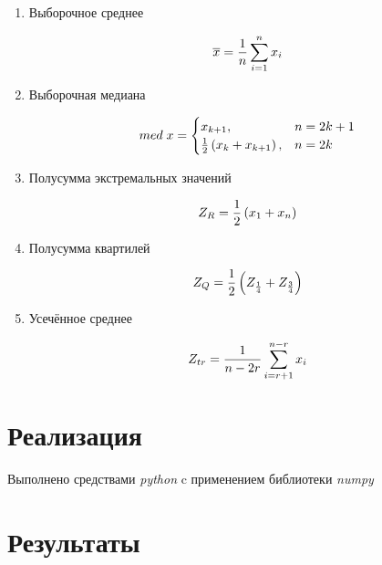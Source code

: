 \documentclass[12pt]{article}
\begin{document}
\begin{enumerate}

\item{Выборочное среднее \cite{average}}

\begin{equation}
\overline{x} = \frac{1}{n}\sum_{i=1}^n x_i \hfill \label{eqn:average}
\end{equation}

\item{Выборочная медиана \cite{med}}

\begin{equation}
med\; x = \begin{cases}
x_{k+1}, & n = 2k+1\\
\frac{1}{2}\left(x_k+x_{k+1}\right), & n = 2k
\end{cases} \hfill  \label{eqn:med}
\end{equation}

\item{Полусумма экстремальных значений \cite{mean_extr}}

\begin{equation} 
Z_R = \frac{1}{2}\left(x_1+x_n\right) \hfill  \label{eqn:mean_extr}
\end{equation}

\item{Полусумма квартилей \cite{quartiles}}

\begin{equation}
Z_Q = \frac{1}{2}\left(Z_{\frac{1}{4}}+Z_{\frac{3}{4}}\right) \hfill  
\label{eqn:quartiles}
\end{equation}

\item{Усечённое среднее \cite{cut_mean}}

\begin{equation}
Z_{tr} = \frac{1}{n - 2r}\sum_{i=r+1}^{n-r} x_i \hfill  \label{eqn:cut_mean}
\end{equation}

\end{enumerate}

\section{Реализация}
Выполнено средствами \textit{python} c применением библиотеки \textit{numpy}\cite{numpy}

\section{Результаты}
\end{document}
